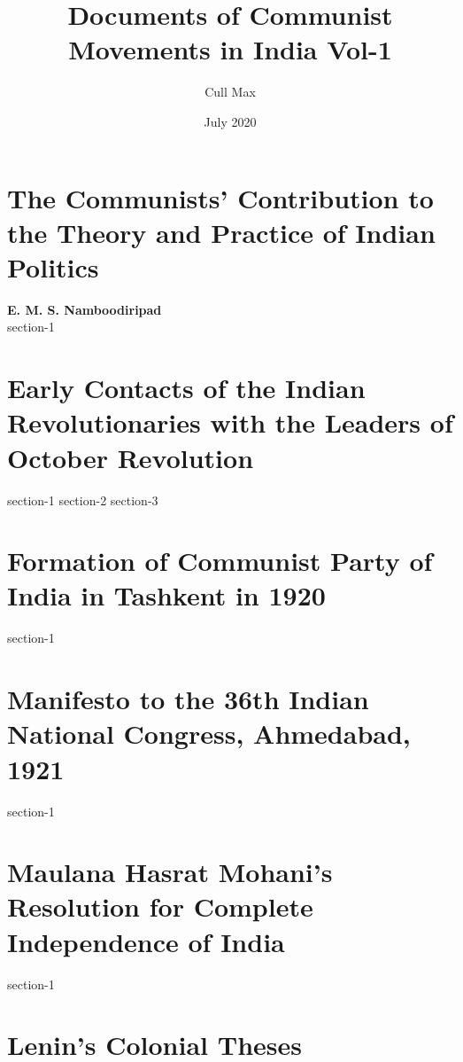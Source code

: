 \documentclass[oneside]{book}
\title{Documents of Communist Movements in India Vol-1}
\author{Cull Max}
\date{July 2020}
\begin{document}
\maketitle
\tableofcontents

\chapter{The Communists’ Contribution to the Theory and Practice of Indian Politics}
\textbf{E. M. S. Namboodiripad}\\
{section-1}

\chapter{Early Contacts of the Indian Revolutionaries with the Leaders of October Revolution}
{section-1}
{section-2}
{section-3}

\chapter{Formation of Communist Party of India in Tashkent in 1920}
{section-1}

\chapter{Manifesto to the 36th Indian National Congress, Ahmedabad, 1921}
{section-1}

\chapter{Maulana Hasrat Mohani's Resolution for Complete Independence of India}
{section-1}

\chapter[5]{Lenin's Colonial Theses\raisebox{.3\baselineskip}{\normalsize\footnotemark}}
\end{document}
